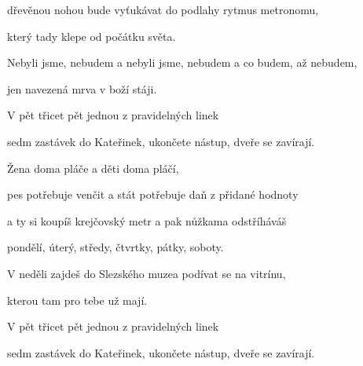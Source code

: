 dřevěnou nohou bude vyťukávat do podlahy rytmus metronomu,

který tady klepe od počátku světa.

Nebyli jsme, nebudem a nebyli jsme, nebudem a co budem, až nebudem,

jen navezená mrva v boží stáji.

V pět třicet pět jednou z pravidelných linek

sedm zastávek do Kateřinek, ukončete nástup, dveře se zavírají.
\ks

\zs
Žena doma pláče a děti doma pláčí,

pes potřebuje venčit a stát potřebuje daň z přidané hodnoty

a ty si koupíš krejčovský metr a pak nůžkama odstříháváš

pondělí, úterý, středy, čtvrtky, pátky, soboty.

V neděli zajdeš do Slezského muzea podívat se na vitrínu,

kterou tam pro tebe už mají.

V pět třicet pět jednou z pravidelných linek

sedm zastávek do Kateřinek, ukončete nástup, dveře se zavírají.
\ks

\kp





